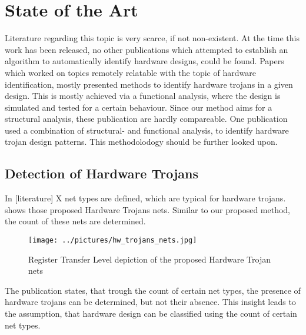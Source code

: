 
\section{State of the Art}
Literature regarding this topic is very scarce, if not non-existent. At the time
this work has been released, no other publications which attempted to establish 
an algorithm to automatically identify hardware designs, could be found.
Papers which worked on topics remotely relatable with the topic of hardware 
identification, mostly presented methods to identify hardware trojans in a given 
design. This is mostly achieved via a functional analysis, where the design is 
simulated and tested for a certain behaviour. Since our method aims for a 
structural analysis, these publication are hardly compareable. 
One publication used a combination of structural- and functional analysis, to 
identify hardware trojan design patterns. This methodolodogy should be further 
looked upon.  

\subsection{Detection of Hardware Trojans}
In [literature] X net types are defined, which are typical for hardware trojans.
\label{hw_trojan_nets} shows those proposed Hardware Trojans nets. Similar to 
our proposed method, the count of these nets are determined. 
 
\begin{figure}
    \texttt{[image: ../pictures/hw\_trojans\_nets.jpg]}
    \label{hw_trojans_nets}
    \caption{Register Transfer Level depiction of the proposed Hardware Trojan nets}
\end{figure}

The publication states, that trough the count of certain net types, the presence
of hardware trojans can be determined, but not their absence.
This insight leads to the assumption, that hardware design can be classified 
using the count of certain net types. 




